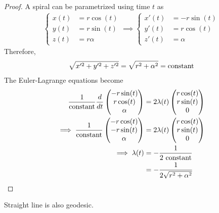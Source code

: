 \documentclass{article}
\begin{document}
	\begin{proof}
		A spiral can be parametrized using time $t$ as
		\begin{align}
			\begin{cases}
				x(t) &= r \cos (t) \\
				y(t) &= r \sin (t) \\
				z(t) &= r \alpha
			\end{cases} \implies
			\begin{cases}
				x'(t) &= - r \sin (t) \\
				y'(t) &= r \cos (t) \\
				z'(t) &= \alpha
			\end{cases}
		\end{align}
		Therefore,
		\begin{align}
			\sqrt{x'^2 + y'^2 + z'^2} = \sqrt{r^2 + \alpha^2} = \text{{constant}}
		\end{align}
		The Euler-Lagrange equations become 
		\begin{align}
			\frac{1}{\text{{constant}}}\frac{d}{dt}
			\begin{pmatrix}
				-r \sin(t) \\
				r \cos(t) \\
				\alpha
			\end{pmatrix} &= 2 \lambda(t) \begin{pmatrix}
				r \cos (t) \\
				r \sin (t) \\
				0
			\end{pmatrix} \\
			\implies
			\frac{1}{\text{{constant}}}
			\begin{pmatrix}
				- r \cos(t) \\
				- r \sin(t) \\
				\alpha
			\end{pmatrix} &= 2 \lambda(t) \begin{pmatrix}
				r \cos (t) \\
				r \sin (t) \\
				0
			\end{pmatrix} \\
			\implies
			\lambda(t) &= - \frac{1}{2\text{{ constant}}} \\
			&= - \frac{1}{2 \sqrt{r^2 + \alpha^2}}
		\end{align}
	\end{proof}
	
	\begin{example}
		Straight line is also geodesic.
	\end{example}
	
\end{document}
